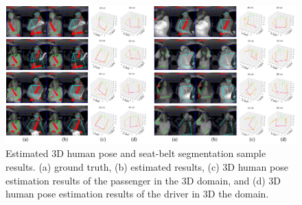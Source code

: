 \documentclass[letterpaper]{article} %
\begin{document}
\begin{figure}[t]
    \centering
    \includegraphics[width=\textwidth]{LaTeX/images/qul.png}
    \caption{Estimated 3D human pose and seat-belt segmentation sample results. (a) ground truth, (b) estimated results, (c) 3D human pose estimation results of the passenger in the 3D domain, and (d) 3D human pose estimation results of the driver in 3D the domain.}
    \label{fig:qualitivity}
\end{figure}

\begin{table}[]
\centering
{}
\caption{Comparison of the left and right body 3D keypoints MPJPE according to the driver and  the passenger.}
\label{tab:leftright}
\end{table}
\end{document}
